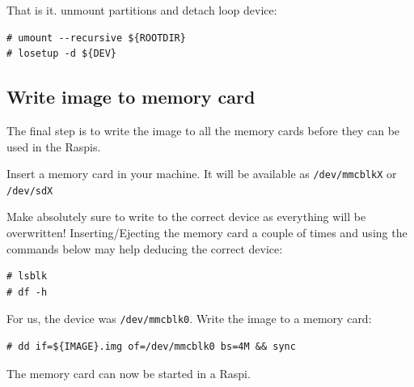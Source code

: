That is it. unmount partitions and detach loop device:
\begin{lstlisting}[]
# umount --recursive ${ROOTDIR}
# losetup -d ${DEV}
\end{lstlisting}
\FloatBarrier
\vspace{-5mm}

\subsection{Write image to memory card}

The final step is to write the image to all the memory cards before they can
be used in the \ac{Raspi}s.



Insert a memory card in your machine. It will be available as
\texttt{/dev/mmcblkX} or \texttt{/dev/sdX}

Make absolutely sure to write to the correct device as everything will be 
overwritten!
Inserting/Ejecting the memory card a couple of times and using the commands
below may help deducing the correct device:

\begin{lstlisting}[]
# lsblk
# df -h
\end{lstlisting}
\FloatBarrier
\vspace{-5mm}

For us, the device was \texttt{/dev/mmcblk0}. Write the image to a memory card:
\begin{lstlisting}[]
# dd if=${IMAGE}.img of=/dev/mmcblk0 bs=4M && sync
\end{lstlisting}
\FloatBarrier
\vspace{-5mm}

The memory card can now be started in a \ac{Raspi}.

